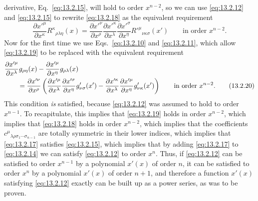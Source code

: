 derivative, Eq.~\eqref{eq:13.2.15}, will hold to order \(x^{n-2}\), so
we can use \eqref{eq:13.2.12} and \eqref{eq:13.2.15} to rewrite
\eqref{eq:13.2.18} as the equivalent requirement
\begin{equation}
  \frac{\partial x'^\mu}{\partial x^\kappa}
  R^\kappa{}_{\rho\lambda\eta}(x)
  =
  \frac{\partial x'^\nu}{\partial x^\rho}
  \frac{\partial x'^\kappa}{\partial x^\lambda}
  \frac{\partial x'^\sigma}{\partial x^\eta}
  R'^\mu{}_{\nu\kappa\sigma}(x')
  \qquad\text{in order \(x^{n-2}\)}.
  \tag{13.2.19}\label{eq:13.2.19}
\end{equation}
Now for the first time we use Eqs.~\eqref{eq:13.2.10} and
\eqref{eq:13.2.11}, which allow \eqref{eq:13.2.19} to be replaced with
the equivalent requirement
\begin{align}
  &\frac{\partial x'^\mu}{\partial x^\lambda}g_{\rho\eta}(x)
  -
  \frac{\partial x'^\mu}{\partial x^\eta}g_{\rho\lambda}(x)
  \notag\\
  &\qquad =
  \frac{\partial x'^\nu}{\partial x^\rho}
  \left(
    \frac{\partial x'^\mu}{\partial x^\lambda}
    \frac{\partial x'^\sigma}{\partial x^\eta}
    g'_{\nu\sigma}(x')
    -
    \frac{\partial x'^\kappa}{\partial x^\lambda}
    \frac{\partial x'^\mu}{\partial x^\eta}
    g'_{\nu\kappa}(x')
  \right)
  \qquad\text{in order \(x^{n-2}\)}.
  \tag{13.2.20}\label{eq:13.2.20}
\end{align}
This condition \emph{is} satisfied, because \eqref{eq:13.2.12} was
assumed to hold to order \(x^{n-1}\). To recapitulate, this implies that
\eqref{eq:13.2.19} holds in order \(x^{n-2}\), which implies that
\eqref{eq:13.2.18} holds in order \(x^{n-2}\), which implies that the
coefficients \(c^\mu{}_{\lambda\rho\sigma_1\cdots\sigma_{n-1}}\) are
totally symmetric in their lower indices, which implies that
\eqref{eq:13.2.17} satisfies \eqref{eq:13.2.15}, which implies that by
adding \eqref{eq:13.2.17} to \eqref{eq:13.2.14} we can satisfy
\eqref{eq:13.2.12} to order \(x^n\). Thus, if \eqref{eq:13.2.12} can
be satisfied to order \(x^{n-1}\) by a polynomial \(x'(x)\) of order
\(n\), it can be satisfied to order \(x^n\) by a polynomial \(x'(x)\) of
order \(n+1\), and therefore a function \(x'(x)\) satisfying
\eqref{eq:13.2.12} exactly can be built up as a power series, as was to be
proven.
